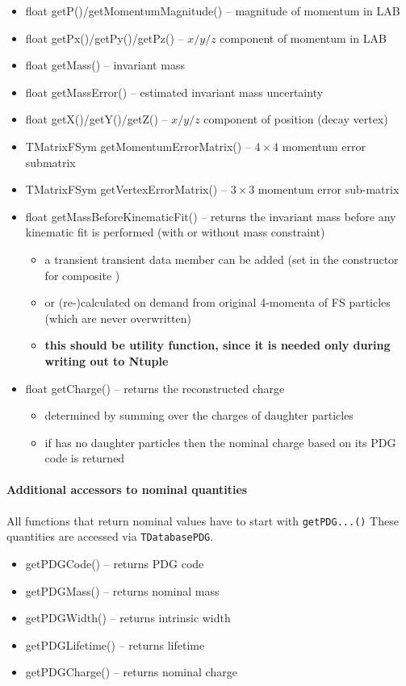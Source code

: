 \begin{itemize}
  \item {\bluett float getP()/getMomentumMagnitude()} -- magnitude of momentum in LAB
  \item {\bluett float getPx()/getPy()/getPz()} -- $x/y/z$ component of momentum in LAB
  \item {\bluett float getMass()} -- invariant mass
  \item {\bluett float getMassError()} -- estimated invariant mass uncertainty
  \item {\bluett float getX()/getY()/getZ()} -- $x/y/z$ component of position (decay vertex)
  \item {\bluett TMatrixFSym getMomentumErrorMatrix()}  -- $4\times4$ momentum error submatrix
  \item {\bluett TMatrixFSym getVertexErrorMatrix()}  -- $3\times3$ momentum error sub-matrix
  \item {\bluett float getMassBeforeKinematicFit()} -- returns the invariant mass before any kinematic fit is performed (with or without mass constraint)
  \begin{itemize}
   \item a transient transient data member can be added (set in the constructor for composite \particle)
   \item or (re-)calculated on demand from original 4-momenta of FS particles (which are never overwritten)
   \item {\bf this should be utility function, since it is needed only during writing out to Ntuple}
  \end{itemize}
  \item {\bluett float getCharge()} -- returns the reconstructed charge 
  \begin{itemize}
   \item determined by summing over the charges of daughter particles
   \item if \particle has no daughter particles then the nominal charge based on its PDG code is returned
  \end{itemize}
\end{itemize}

\paragraph{Additional accessors to nominal quantities} All functions that return nominal values have to start with {\tt getPDG...()} These 
quantities are accessed via {\tt TDatabasePDG}.
\begin{itemize}
 \item {\bluett getPDGCode()} -- returns PDG code
 \item {\bluett getPDGMass()} -- returns nominal mass
 \item {\bluett getPDGWidth()} -- returns intrinsic width
 \item {\bluett getPDGLifetime()} -- returns lifetime
 \item {\bluett getPDGCharge()} -- returns nominal charge
\end{itemize}

